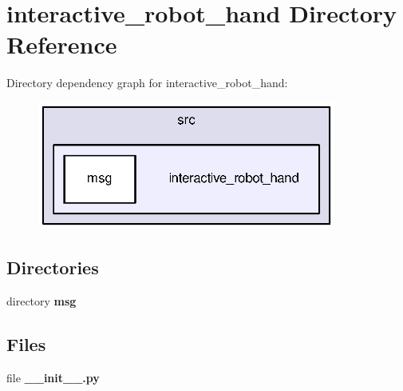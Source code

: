 \section{interactive\-\_\-robot\-\_\-hand Directory Reference}
\label{dir_80aa6af395bb05c1070db52ce94712b9}
Directory dependency graph for interactive\-\_\-robot\-\_\-hand\-:
\nopagebreak
\begin{figure}[H]
\begin{center}
\leavevmode
\includegraphics[width=278pt]{dir_80aa6af395bb05c1070db52ce94712b9_dep}
\end{center}
\end{figure}
\subsection*{Directories}
\begin{DoxyCompactItemize}
\item 
directory {\bf msg}
\end{DoxyCompactItemize}
\subsection*{Files}
\begin{DoxyCompactItemize}
\item 
file {\bf \-\_\-\-\_\-init\-\_\-\-\_\-.\-py}
\end{DoxyCompactItemize}
